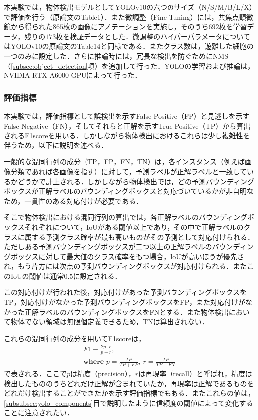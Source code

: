     本実験では，物体検出モデルとしてYOLOv10の六つのサイズ（N/S/M/B/L/X）で評価を行う（原論文\cite{wang2024yolov10}のTable1）．また微調整（Fine-Tuning）には，共焦点顕微鏡から得られた$865$枚の画像にアノテーションを実施し，そのうち$692$枚を学習データ，残りの$173$枚を検証データとした．微調整のハイパーパラメータについてはYOLOv10の原論文\cite{wang2024yolov10}のTable14と同様である．またクラス数は，遊離した細胞の一つのみに設定した．さらに推論時には，冗長な検出を防ぐためにNMS（\ref{subsec:object_detection}項）を追加して行った．YOLOの学習および推論は，NVIDIA RTX A6000 GPUによって行った．

    \subsubsection{評価指標}

    本実験では，評価指標として誤検出を示すFalse Positive（FP）と見逃しを示すFalse Negative（FN），そしてそれらと正解を示すTrue Positive（TP）から算出されるF1scoreを用いる．しかしながら物体検出におけるこれらは少し複雑性を伴うため，以下に説明を述べる．

    一般的な混同行列の成分（TP，FP，FN，TN）は，各インスタンス（例えば画像分類であれば各画像を指す）に対して，予測ラベルが正解ラベルと一致しているかどうかで計上される．しかしながら物体検出では，どの予測バウンディングボックスが正解ラベルのバウンディングボックスと対応づいているかが非自明なため，一貫性のある対応付けが必要である．

    そこで物体検出における混同行列の算出では，各正解ラベルのバウンディングボックスそれぞれについて，IoUがある閾値以上であり，その中で正解ラベルのクラスに属する予測クラス確率が最も高いものがその予測として対応付けられる．ただしある予測バウンディングボックスが二つ以上の正解ラベルのバウンディングボックスに対して最大値のクラス確率をもつ場合，IoUが高いほうが優先され，もう片方には次点の予測バウンディングボックスが対応付けられる．またこのIoUの閾値は通常$0.5$に設定される．

    この対応付けが行われた後，対応付けがあった予測バウンディングボックスをTP，対応付けがなかった予測バウンディングボックスをFP，また対応付けがなかった正解ラベルのバウンディングボックスをFNとする．また物体検出において物体でない領域は無限個定義できるため，TNは算出されない．

    これらの混同行列の成分を用いてF1scoreは，
    \begin{equation}
        \label{eq:f1_score}
        \begin{gathered}
            F1 = \frac{2 p\cdot r}{p + r},
            \\ \textbf{where } p = \frac{TP}{TP + FP}, ~ r = \frac{TP}{TP + FN}
        \end{gathered}
    \end{equation}
    で表される．ここで$p$は精度（precision），$r$は再現率（recall）と呼ばれ，精度は検出したもののうちどれだけ正解が含まれていたか，再現率は正解であるものをどれだけ検出することができたかを示す評価指標でもある．またこれらの値は，\ref{subsubsec:yolo_components}目で説明したように信頼度の閾値によって変化することに注意されたい．

